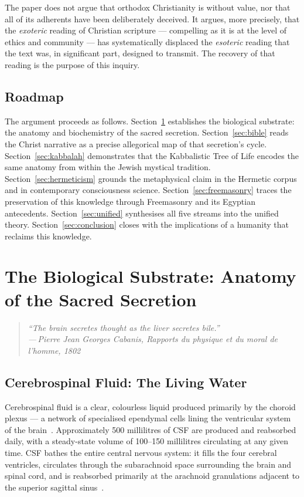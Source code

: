\documentclass[12pt, a4paper]{article}
\newcommand{\epigraph}[2]{%
  \begin{quote}
    \itshape ``#1''\\[0.3em]
    \normalfont\small\hfill ---\,#2
  \end{quote}
}
\begin{document}
The paper does not argue that orthodox Christianity is without value, nor that
all of its adherents have been deliberately deceived. It argues, more
precisely, that the \emph{exoteric} reading of Christian scripture —
compelling as it is at the level of ethics and community — has systematically
displaced the \emph{esoteric} reading that the text was, in significant part,
designed to transmit. The recovery of that reading is the purpose of this
inquiry.

\subsection{Roadmap}

The argument proceeds as follows. Section~\ref{sec:biology} establishes the
biological substrate: the anatomy and biochemistry of the sacred secretion.
Section~\ref{sec:bible} reads the Christ narrative as a precise allegorical
map of that secretion's cycle. Section~\ref{sec:kabbalah} demonstrates that
the Kabbalistic Tree of Life encodes the same anatomy from within the Jewish
mystical tradition. Section~\ref{sec:hermeticism} grounds the metaphysical
claim in the Hermetic corpus and in contemporary consciousness science.
Section~\ref{sec:freemasonry} traces the preservation of this knowledge
through Freemasonry and its Egyptian antecedents. Section~\ref{sec:unified}
synthesises all five streams into the unified theory. Section~\ref{sec:conclusion}
closes with the implications of a humanity that reclaims this knowledge.

\section{The Biological Substrate: Anatomy of the Sacred Secretion}
\label{sec:biology}

\epigraph{The brain secretes thought as the liver secretes bile.}{Pierre Jean
Georges Cabanis, \emph{Rapports du physique et du moral de l'homme}, 1802}

\subsection{Cerebrospinal Fluid: The Living Water}

Cerebrospinal fluid is a clear, colourless liquid produced primarily by the
choroid plexus — a network of specialised ependymal cells lining the
ventricular system of the brain~\autocite[1289]{gray2016}. Approximately 500
millilitres of CSF are produced and reabsorbed daily, with a steady-state
volume of 100--150 millilitres circulating at any given time. CSF bathes the
entire central nervous system: it fills the four cerebral ventricles,
circulates through the subarachnoid space surrounding the brain and spinal
cord, and is reabsorbed primarily at the arachnoid granulations adjacent to
the superior sagittal sinus~\autocite{knie2018}.
\end{document}
